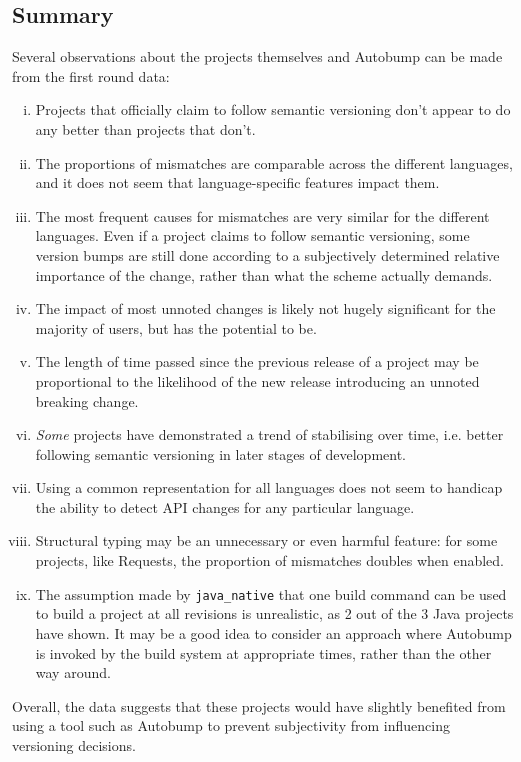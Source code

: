 \documentclass{l4proj}
\newcommand\genericstyle{\lstset{basicstyle=\ttm}}
\newcommand\codeinline[1]{{\genericstyle\lstinline!#1!}}
\begin{document}
\subsection{Summary}

Several observations about the projects themselves and Autobump can be
made from the first round data:

\begin{enumerate}[(i)]
\item Projects that officially claim to follow semantic versioning
don't appear to do any better than projects that don't.
\item The proportions of mismatches are comparable across the different
languages, and it does not seem that language-specific features impact
them.
\item The most frequent causes for mismatches are very similar for the
different languages. Even if a project claims to follow semantic
versioning, some version bumps are still done according to a
subjectively determined relative importance of the change, rather than
what the scheme actually demands.
\item The impact of most unnoted changes is likely not hugely
significant for the majority of users, but has the potential to be.
\item The length of time passed since the previous release of a
project may be proportional to the likelihood of the new release
introducing an unnoted breaking change.
\item \textit{Some} projects have demonstrated a trend of stabilising
over time, i.e. better following semantic versioning in later stages
of development.
\item Using a common representation for all languages does not seem to
handicap the ability to detect API changes for any particular
language.
\item Structural typing may be an unnecessary or even harmful feature:
for some projects, like Requests, the proportion of mismatches doubles
when enabled.
\item The assumption made by \codeinline{java_native} that one build
command can be used to build a project at all revisions is
unrealistic, as 2 out of the 3 Java projects have shown. It may be a
good idea to consider an approach where Autobump is invoked by the
build system at appropriate times, rather than the other way around.
\end{enumerate}

Overall, the data suggests that these projects would have slightly
benefited from using a tool such as Autobump to prevent subjectivity
from influencing versioning decisions.
\end{document}
